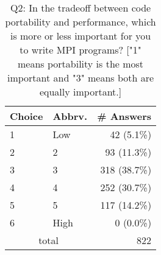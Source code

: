 \begin{table}[htb]%
\begin{center}%
\caption{Q2: In the tradeoff between code portability and performance, which is more or less important for you to write MPI programs? ["1" means portability is the most important and "3" means both are equally important.]}%
\label{tab:Q2-ans}%
\begin{tabular}{l|l|r}%
\hline%
Choice & Abbrv. & \# Answers \\%
\hline%
1 & Low & 42 (5.1\%) \\%
2 & 2 & 93 (11.3\%) \\%
3 & 3 & 318 (38.7\%) \\%
4 & 4 & 252 (30.7\%) \\%
5 & 5 & 117 (14.2\%) \\%
6 & High & 0 (0.0\%) \\%
\hline%
\multicolumn{2}{c}{total} & 822 \\%
\hline%
\end{tabular}%
\end{center}%
\end{table}%
